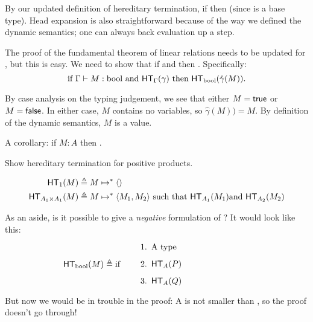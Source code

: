 \documentclass{article}
\begin{document}
By our updated definition of hereditary termination, if  then  (since \booltype{} is a base type). Head expansion is also straightforward because of the way we defined the dynamic semantics; one can always back evaluation up a step.

The proof of the fundamental theorem of linear relations needs to be updated for \booltype, but this is easy. We need to show that if  and \hterm{\Gamma}{\gamma} then . Specifically:
\[
\text{if} \ \hasEF{\Gamma}{M}{\booltype}  \ \text{and} \  \hterm{\Gamma}{\gamma} \ \text{then} \  \hterm{\booltype}{\hat\gamma(M)}.
\]

By case analysis on the typing judgement, we see that either $M = \mathsf{true}$ or $M = \mathsf{false}$. In either case, $M$ contains no variables, so $\hat\gamma(M)) = M$. By definition of the dynamic semantics, $M$ is a value.

A corollary: if $M : A$ then .

\begin{exercise}
Show hereditary termination for positive products.

\begin{align*}
\mathsf{HT}_{1}(M) &\triangleq M \mapsto^* \langle \rangle\\
\mathsf{HT}_{A_1 \times A_1}(M) &\triangleq M \mapsto^* \langle M_1, M_2\rangle \ \text{such that} \  \mathsf{HT}_{A_1}(M_1) \text{and} \  \mathsf{HT}_{A_2}(M_2)\\
\end{align*}
\end{exercise}

As an aside, is it possible to give a \textit{negative} formulation of \booltype? It would look like this:

\[
\hterm{\booltype}{M} \triangleq \text{if} \hspace{12pt} \begin{minipage}{5cm}
        \begin{enumerate}
        \item A type
        \item \hterm{A}{P}
        \item \hterm{A}{Q}
        \end{enumerate}
\end{minipage}\\
\]

But now we would be in trouble in the proof: A is not smaller than \booltype, so the proof doesn't go through!
\end{document}
